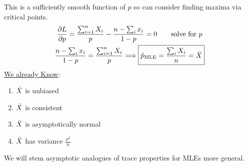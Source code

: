 This is a sufficiently smooth function of $p$ so can consider finding maxima via critical points.
\begin{gather*}
	\frac{\partial L}{\partial p} = \frac{\sum_{i=1}^n X_i}{p} - \frac{n- \sum_i x_i}{1-p} = 0 \qquad \text{solve for $p$}\\
	\frac{n- \sum_i x_i}{1-p} = \frac{\sum_{i=1}^n X_i}{p} \Longrightarrow \boxed{\hat{p}_{\text{MLE}} = \frac{\sum_i X_i}{n} = \bar{X}}
\end{gather*}
\underline{We already Know}:
\begin{enumerate}
	\item $\bar{X}$ is unbiased
	\item $\bar{X}$ is consistent
	\item $\bar{X}$ is asymptotically normal
	\item $\bar{X}$ has variance $\frac{\sigma^2}{n}$
\end{enumerate}
We will stem asymptotic analogues of trace properties for MLEs more general. 